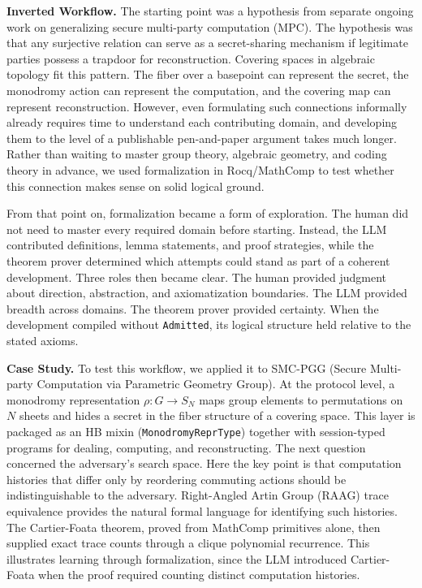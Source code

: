\documentclass[11pt,a4paper]{article}
\begin{document}
\noindent\textbf{Inverted Workflow.}
The starting point was a hypothesis from separate ongoing work on generalizing secure multi-party computation (MPC). The hypothesis was that any surjective relation can serve as a secret-sharing mechanism if legitimate parties possess a trapdoor for reconstruction. Covering spaces in algebraic topology fit this pattern. The fiber over a basepoint can represent the secret, the monodromy action can represent the computation, and the covering map can represent reconstruction. However, even formulating such connections informally already requires time to understand each contributing domain, and developing them to the level of a publishable pen-and-paper argument takes much longer. Rather than waiting to master group theory, algebraic geometry, and coding theory in advance, we used formalization in Rocq/MathComp to test whether this connection makes sense on solid logical ground.

From that point on, formalization became a form of exploration. The human did not need to master every required domain before starting. Instead, the LLM contributed definitions, lemma statements, and proof strategies, while the theorem prover determined which attempts could stand as part of a coherent development. Three roles then became clear. The human provided judgment about direction, abstraction, and axiomatization boundaries. The LLM provided breadth across domains. The theorem prover provided certainty. When the development compiled without \texttt{Admitted}, its logical structure held relative to the stated axioms.

\noindent\textbf{Case Study.}
To test this workflow, we applied it to SMC-PGG (Secure Multi-party Computation via Parametric Geometry Group). At the protocol level, a monodromy representation $\rho : G \to S_N$ maps group elements to permutations on $N$ sheets and hides a secret in the fiber structure of a covering space. This layer is packaged as an HB mixin (\texttt{MonodromyReprType}) together with session-typed programs for dealing, computing, and reconstructing. The next question concerned the adversary's search space. Here the key point is that computation histories that differ only by reordering commuting actions should be indistinguishable to the adversary. Right-Angled Artin Group (RAAG) trace equivalence provides the natural formal language for identifying such histories. The Cartier-Foata theorem, proved from MathComp primitives alone, then supplied exact trace counts through a clique polynomial recurrence. This illustrates learning through formalization, since the LLM introduced Cartier-Foata when the proof required counting distinct computation histories.
\end{document}
